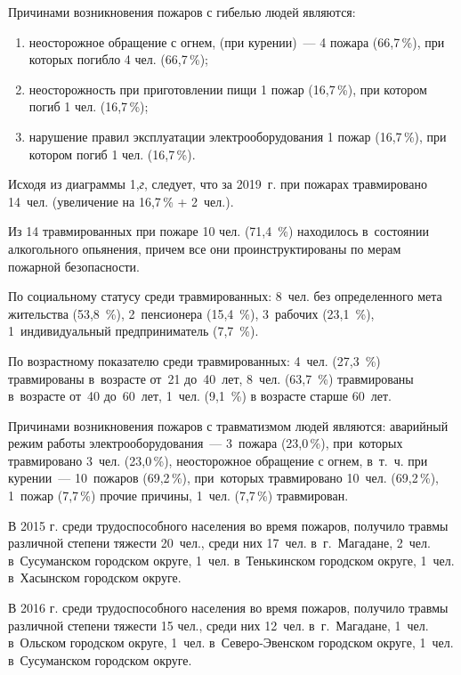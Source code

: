 Причинами возникновения пожаров с гибелью людей являются:
\begin{enumerate}[noitemsep]\vspace{-8pt}
\item неосторожное обращение с огнем, (при курении)~--- 4 пожара (66,7\,\%), при которых погибло 4 чел. (66,7\,\%);
\item неосторожность при приготовлении пищи 1 пожар (16,7\,\%), при котором погиб 1 чел. (16,7\,\%);
\item нарушение правил эксплуатации электрооборудования 1 пожар (16,7\,\%), при котором погиб 1 чел. (16,7\,\%).
\end{enumerate}
\vspace{-6pt}

Исходя из диаграммы 1,\textit{г}, следует, что за 2019~г. при пожарах травмировано 14~чел. (увеличение на 16,7\,\% + 2~чел.).

Из 14 травмированных при пожаре 10 чел. (71,4~\%) находилось в~состоянии
алкогольного опьянения, причем все они проинструктированы по мерам
пожарной безопасности.

По социальному статусу среди травмированных: 8~чел. без определенного
мета жительства (53,8~\%), 2~пенсионера (15,4~\%), 3~рабочих (23,1~\%), 1~индивидуальный предприниматель (7,7~\%).

По возрастному показателю среди травмированных: 4~чел. (27,3~\%)
травмированы в~возрасте от~21 до~40~лет, 8~чел. (63,7~\%) травмированы в~возрасте от~40 до~60~лет, 1~чел. (9,1~\%) в возрасте старше 60~лет.

Причинами возникновения пожаров с травматизмом людей являются: аварийный режим работы электрооборудования~--- 3~пожара (23,0\,\%), при~которых травмировано 3~чел. (23,0\,\%), неосторожное обращение с огнем, в~т.~ч. при курении~--- 10~пожаров (69,2\,\%), при~которых травмировано 10~чел. (69,2\,\%), 1~пожар (7,7\,\%) прочие причины, 1~чел. (7,7\,\%) травмирован.

В 2015 г. среди трудоспособного населения во время пожаров, получило травмы различной степени тяжести 20~чел., среди них 17~чел. в~г.~Магадане, 2~чел. в~Сусуманском городском округе, 1~чел. в~Тенькинском городском округе, 1~чел. в~Хасынском городском округе.

В 2016 г. среди трудоспособного населения во время пожаров, получило травмы различной степени тяжести 15 чел., среди них 12~чел. в~г.~Магадане, 1~чел. в~Ольском городском округе, 1~чел. в~Северо-Эвенском городском округе, 1~чел. в~Сусуманском городском округе.

